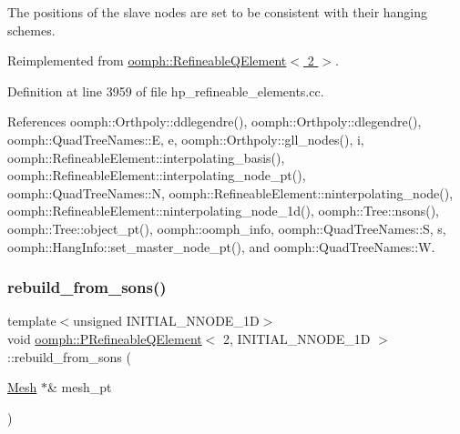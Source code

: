 The positions of the slave nodes are set to be consistent with their hanging schemes. 

Reimplemented from \hyperlink{classoomph_1_1RefineableQElement_3_012_01_4_a711171287234070046a02bbf56ed2664}{oomph\+::\+Refineable\+Q\+Element$<$ 2 $>$}.



Definition at line 3959 of file hp\+\_\+refineable\+\_\+elements.\+cc.



References oomph\+::\+Orthpoly\+::ddlegendre(), oomph\+::\+Orthpoly\+::dlegendre(), oomph\+::\+Quad\+Tree\+Names\+::E, e, oomph\+::\+Orthpoly\+::gll\+\_\+nodes(), i, oomph\+::\+Refineable\+Element\+::interpolating\+\_\+basis(), oomph\+::\+Refineable\+Element\+::interpolating\+\_\+node\+\_\+pt(), oomph\+::\+Quad\+Tree\+Names\+::N, oomph\+::\+Refineable\+Element\+::ninterpolating\+\_\+node(), oomph\+::\+Refineable\+Element\+::ninterpolating\+\_\+node\+\_\+1d(), oomph\+::\+Tree\+::nsons(), oomph\+::\+Tree\+::object\+\_\+pt(), oomph\+::oomph\+\_\+info, oomph\+::\+Quad\+Tree\+Names\+::S, s, oomph\+::\+Hang\+Info\+::set\+\_\+master\+\_\+node\+\_\+pt(), and oomph\+::\+Quad\+Tree\+Names\+::W.

\mbox{\label{classoomph_1_1PRefineableQElement_3_012_00_01INITIAL__NNODE__1D_01_4_a53d48e7e3310a02a315562ed628bd4b5}} 
\subsubsection{\texorpdfstring{rebuild\+\_\+from\+\_\+sons()}{rebuild\_from\_sons()}}
{\footnotesize\ttfamily template$<$unsigned I\+N\+I\+T\+I\+A\+L\+\_\+\+N\+N\+O\+D\+E\+\_\+1D$>$ \\
void \hyperlink{classoomph_1_1PRefineableQElement}{oomph\+::\+P\+Refineable\+Q\+Element}$<$ 2, I\+N\+I\+T\+I\+A\+L\+\_\+\+N\+N\+O\+D\+E\+\_\+1D $>$\+::rebuild\+\_\+from\+\_\+sons (\begin{DoxyParamCaption}\item[{\hyperlink{classoomph_1_1Mesh}{Mesh} $\ast$\&}]{mesh\+\_\+pt }\end{DoxyParamCaption})\hspace{0.3cm}{\ttfamily [virtual]}}

